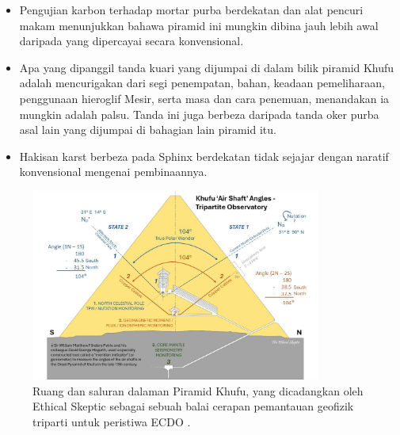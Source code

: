 \documentclass[10pt,twocolumn,letterpaper]{article}
\begin{document}
\begin{flushleft}
\begin{itemize}
    \item Pengujian karbon terhadap mortar purba berdekatan dan alat pencuri makam menunjukkan bahawa piramid ini mungkin dibina jauh lebih awal daripada yang dipercayai secara konvensional.
    \item Apa yang dipanggil tanda kuari yang dijumpai di dalam bilik piramid Khufu adalah mencurigakan dari segi penempatan, bahan, keadaan pemeliharaan, penggunaan hieroglif Mesir, serta masa dan cara penemuan, menandakan ia mungkin adalah palsu. Tanda ini juga berbeza daripada tanda oker purba asal lain yang dijumpai di bahagian lain piramid itu.
    \item Hakisan karst berbeza pada Sphinx berdekatan tidak sejajar dengan naratif konvensional mengenai pembinaannya.
\end{itemize}
\end{flushleft}

\begin{figure}[b]
\begin{center}
\includegraphics[width=0.85\textwidth]{shafts.jpg}
\end{center}
   \caption{Ruang dan saluran dalaman Piramid Khufu, yang dicadangkan oleh Ethical Skeptic sebagai sebuah balai cerapan pemantauan geofizik triparti untuk peristiwa ECDO \cite{28}.}
\label{fig:5}
\end{figure}
\end{document}
